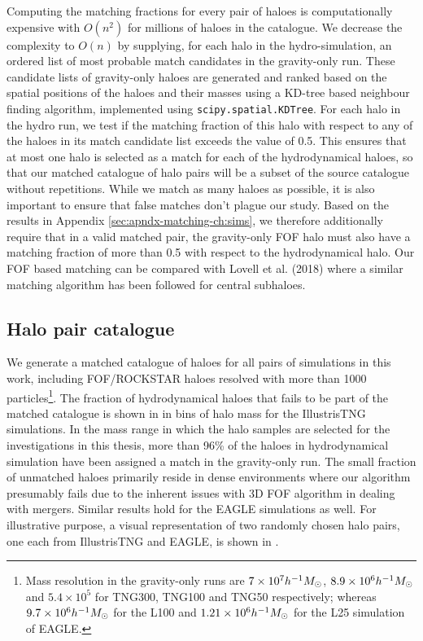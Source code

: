 Computing the matching fractions 
for every pair of haloes is computationally expensive with $O(n^2)$ for millions of haloes in the catalogue. We decrease the complexity to $O(n)$ by supplying, for each halo in the hydro-simulation, an ordered list of most probable match candidates in the gravity-only run. These candidate lists of gravity-only haloes are generated and ranked based on the spatial positions of the haloes and their masses using a KD-tree based neighbour finding algorithm, implemented using \texttt{scipy.spatial.KDTree}.
For each halo in the hydro run, we test if the matching fraction of this halo with respect to any of the haloes in its match candidate list exceeds the value of 0.5. This ensures that at most one halo is selected as a match for each of the hydrodynamical haloes, so that our matched catalogue of halo pairs will be a subset of the source catalogue without repetitions.
While we match as many haloes as possible, it is also important to ensure that false matches don't plague our study. Based on the results in Appendix \ref{sec:apndx-matching-ch:sims}, we therefore additionally require that in a valid matched pair, the gravity-only FOF halo must also have a matching fraction of more than 0.5 with respect to the hydrodynamical halo.
Our FOF based matching can be compared with
Lovell et al. (2018) \citep[][]{2018MNRAS.481.1950L} where a similar matching algorithm has been followed for central subhaloes.

\subsection{Halo pair catalogue}
We generate a matched catalogue of haloes for all pairs of simulations in this work, including FOF/ROCKSTAR haloes resolved with more than 1000 particles\footnote{Mass resolution in the gravity-only runs are $7 \times 10^7 h^{-1}M_{\odot}$, $8.9 \times 10^6 h^{-1}M_{\odot}$ and $5.4 \times 10^5$ for TNG300, TNG100 and TNG50 respectively; whereas $9.7 \times 10^6 h^{-1}M_{\odot}$ for the L100 and $1.21 \times 10^6 h^{-1}M_{\odot}$ for the L25 simulation of EAGLE.}. The fraction of hydrodynamical haloes that fails to be part of the matched catalogue is shown in  in bins of halo mass for the IllustrisTNG simulations. %
In the mass range in which the halo samples are selected for the investigations in this thesis, more than 96\% of the haloes in hydrodynamical simulation have been assigned a match in the gravity-only run. The small fraction of unmatched haloes primarily reside in dense environments 
where our algorithm presumably fails due to
the inherent issues with 3D FOF algorithm in dealing with mergers. Similar results hold for the EAGLE simulations as well. 
For illustrative purpose, a visual representation of two randomly chosen halo pairs, one each from IllustrisTNG and EAGLE, is shown in . 










